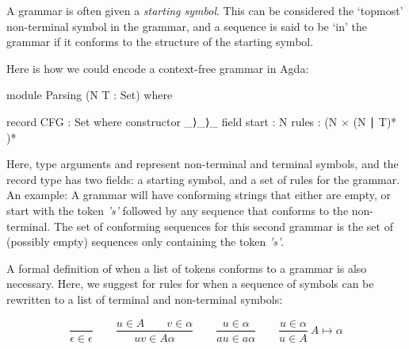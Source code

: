 	A grammar is often given a \emph{starting symbol}. This can be considered the
	`topmost' non-terminal symbol in the grammar, and a sequence is said to be
	`in' the grammar if it conforms to the structure of the starting symbol.

	Here is how we could encode a context-free grammar in Agda:

	\begin{code}
		module Parsing (N T : Set) where

		record CFG : Set where
		  constructor _⟩_⟩_
		  field
		    start : N
		    rules : (N × (N ∣ T)* )*
	\end{code}

	Here, type arguments  and  represent non-terminal and
	terminal symbols, and the record type has two fields: a starting symbol,
	and a set of rules for the grammar.  An example: A grammar 
will have conforming strings that
	either are empty, or start with the token \emph{'s'}
followed by any
	sequence that conforms to the  non-terminal. The set of
	conforming sequences for this second grammar is the set of (possibly empty)
	sequences only containing the token \emph{'s'}.

	A formal definition of when a list of tokens conforms to a grammar is also
	necessary. Here, we suggest for rules for when a sequence of symbols can be
	rewritten to a list of terminal and non-terminal symbols:

\[
\frac{\ }{\epsilon\in\epsilon} \qquad
\frac{u\in A \qquad v\in\alpha}{uv\in A\alpha} \qquad
\frac{u\in\alpha}{au\in a\alpha} \qquad
\frac{u\in\alpha}{u\in A}\ A \mapsto \alpha
\]


